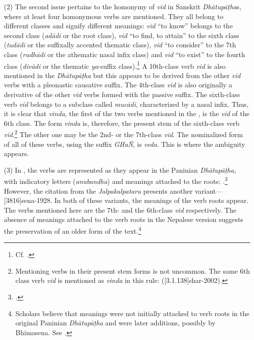 (2) The second issue pertains to the homonymy of \emph{vid} in Sanskrit \emph{Dhātupāṭha}s, 
	 		where at least four homonymous verbs are mentioned. 
	 		They all belong to different classes and signify different meanings: 
	 		\emph{\root vid} “to know” belongs to the second class (\emph{adādi} or the root class), 
	 		\emph{\root vid} “to find, to attain” to the sixth class (\emph{tudādi} or the suffixally accented thematic class), 
	 		\emph{\root vid} “to consider” to the 7th class (\emph{rudhādi} or the athematic nasal infix class) and 
	 		\emph{\root vid} “to exist” to the fourth class (\emph{divādi} or the thematic \emph{ya}-suffix class).\footnote{
	 			Cf.  
	 			\parencite[402]{gada-1904}.}  
 			A 10th-class verb \emph{\root vid} is also mentioned in the \emph{Dhātupāṭha} 
 			but this appears to be derived from the other \emph{vid} verbs with a pleonastic causative suffix. 
 			The 4th-class \emph{vid} is also originally a derivative of the other \emph{vid} verbs formed with the passive suffix. 
 			The sixth-class verb \emph{vid} belongs to a subclass called \emph{mucādi}, characterized by a nasal infix. 
 			Thus, it is clear that \emph{vinda}, the first of the two verbs mentioned in the \SS, 
 			is the \emph{vid} of the 6th class. 
 			The form \emph{vinda} is, therefore, the present stem of the sixth-class verb \emph{vid}.\footnote{ 
 				Mentioning verbs in their present stem forms is not uncommon.
 				The same 6th class verb \root \emph{vid} is mentioned as \emph{vinda} in this rule:
 				 (\volcite{}[3.1.138]{shar-2002}).}
 			 The other one may be the 2nd- or the 7th-class \emph{vid}. 
 			 The nominalized form of all of these verbs, using the suffix \emph{GHaÑ}, is \emph{veda}. 
 			 This is where the ambiguity appears. 
	 		
(3) In \SuComma{}{}, the verbs are represented as they appear 
	 		in the Paninian \emph{Dhātupāṭha}, with indicatory letters (\emph{anubandha}) and meanings attached to the roots:
	 		.\footnote{.}
	 		However, the citation from the \emph{Jalpakalpataru} presents another variant--- 
	 		[3816]{sena-1928}. 
	 		In both of these variants, the meanings of the verb roots appear. 
	 		The verbs mentioned here are the 7th- and the 6th-class \root \emph{vid} respectively. 
	 		The absence of meanings attached to the verb roots in the Nepalese version suggests the preservation 
	 		of an older form of the text.\footnote{
	 				Scholars believe that meanings were not initially attached to verb roots 
	 				in the original Paninian \emph{Dhātupāṭha} 
	 				and were later additions, possibly by Bhīmasena. See \cite[161--163]{card-1976}.}
 				

